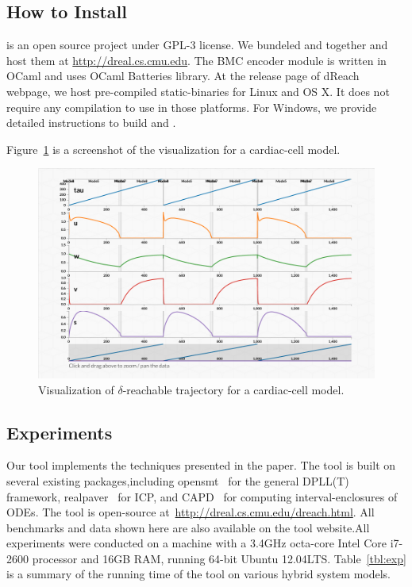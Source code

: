 \subsection{How to Install}
\dReach{} is an open source project under GPL-3 license. We bundeled
\dReal{} and \dReach{} together and host them at
\url{http://dreal.cs.cmu.edu}. The BMC encoder module is written in
OCaml and uses OCaml Batteries library. At the release page of dReach
webpage, we host pre-compiled static-binaries for Linux and OS X. It
does not require any compilation to use \dReach{} in those
platforms. For Windows, we provide detailed instructions to build
\dReach{} and \dReal{}.

Figure~\ref{fig:viz} is a screenshot of the
visualization for a cardiac-cell model.
\begin{figure}
  \centering
  \includegraphics[width=\textwidth]{images/cardiac}
  \caption{Visualization of $\delta$-reachable trajectory for
    a cardiac-cell model.}
  \label{fig:viz}
\end{figure}

\subsection{Experiments}\label{sec:exp}

Our tool \dReach{} implements the techniques presented in the
paper. The tool is built on several existing packages,including {\sf
  opensmt}~\cite{DBLP:conf/tacas/BruttomessoPST10} for the general
DPLL(T) framework, {\sf
  realpaver}~\cite{DBLP:journals/toms/GranvilliersB06} for ICP, and
{\sf CAPD}~\cite{capd} for computing interval-enclosures of ODEs. The
tool is open-source at~\url{http://dreal.cs.cmu.edu/dreach.html}. All
benchmarks and data shown here are also available on the tool
website.All experiments were conducted on a machine with a 3.4GHz
octa-core Intel Core i7-2600 processor and 16GB RAM, running 64-bit
Ubuntu 12.04LTS. Table~\ref{tbl:exp} is a summary of the running time
of the tool on various hybrid system models.

